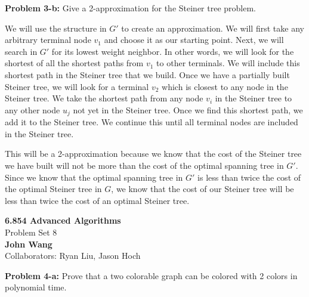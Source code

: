 \documentclass[psamsfonts]{amsart}
\newenvironment{sol}{\vspace{0.25cm}{\large \bfseries Solution:}}{\qedsymbol}
\newenvironment{prob}[1]{\begin{framed}{\large \bfseries Problem #1:}}{\end{framed}}
\newcommand{\makenewtitle}{
    \begin{center}
    {\huge \bfseries 6.854 Advanced Algorithms} \\
    Problem Set 8\\
    \vspace{0.25cm}
    {\bfseries John Wang} \\
    Collaborators: Ryan Liu, Jason Hoch 
    \end{center}
    \vspace{0.5cm}
}
\begin{document}
\begin{prob}{3-b}
Give a 2-approximation for the Steiner tree problem.
\end{prob}
\begin{sol}
We will use the structure in $G'$ to create an approximation. We will first take any arbitrary terminal node $v_1$ and choose it as our starting point. Next, we will search in $G'$ for its lowest weight neighbor. In other words, we will look for the shortest of all the shortest paths from $v_1$ to other terminals. We will include this shortest path in the Steiner tree that we build. Once we have a partially built Steiner tree, we will look for a terminal $v_2$ which is closest to any node in the Steiner tree. We take the shortest path from any node $v_i$ in the Steiner tree to any other node $u_j$ not yet in the Steiner tree. Once we find this shortest path, we add it to the Steiner tree. We continue this until all terminal nodes are included in the Steiner tree.

This will be a 2-approximation because we know that the cost of the Steiner tree we have built will not be more than the cost of the optimal spanning tree in $G'$. Since we know that the optimal spanning tree in $G'$ is less than twice the cost of the optimal Steiner tree in $G$, we know that the cost of our Steiner tree will be less than twice the cost of an optimal Steiner tree.
\end{sol}

\newpage
\makenewtitle

\begin{prob}{4-a}
Prove that a two colorable graph can be colored with 2 colors in polynomial time.
\end{prob}
\end{document}
